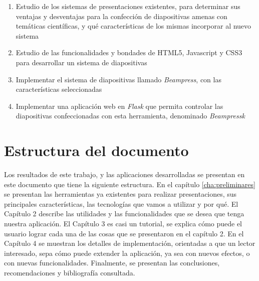 \begin{introduction}
		\begin{enumerate}
			\item Estudio de los sistemas de presentaciones existentes, para determinar sus ventajas y desventajas para la confección de diapositivas amenas con temáticas científicas, y qué características de los mismas incorporar al nuevo sistema
			\item Estudio de las funcionalidades y bondades de HTML5, Javascript y CSS3 para desarrollar un sistema de diapositivas
			\item Implementar el sistema de diapositivas llamado \textit{Beampress}, con las características seleccionadas
			\item Implementar una aplicación web en \textit{Flask} que permita controlar las diapositivas confeccionadas con esta herramienta, denominado \textit{Beampressk}
		\end{enumerate}

	\section{Estructura del documento} %
	\label{sec:estructura_del_documento}
	
		Los resultados de este trabajo, y las aplicaciones desarrolladas se presentan en este documento que tiene la siguiente estructura. En el capítulo \ref{cha:preliminares} se presentan las herramientas ya existentes para realizar presentaciones, sus principales características, las tecnologías que vamos a utilizar y por qué. El Capítulo 2 describe las utilidades y las funcionalidades que se desea que tenga nuestra aplicación. El Capítulo 3 es casi un tutorial, se explica cómo puede el usuario lograr cada una de las cosas que se presentaron en el capítulo 2. En el Capítulo 4 se muestran los detalles de implementación, orientadas a que un lector interesado, sepa cómo puede extender la aplicación, ya sea con nuevos efectos, o con nuevas funcionalidades. Finalmente, se presentan las conclusiones, recomendaciones y bibliografía consultada.





\end{introduction}




